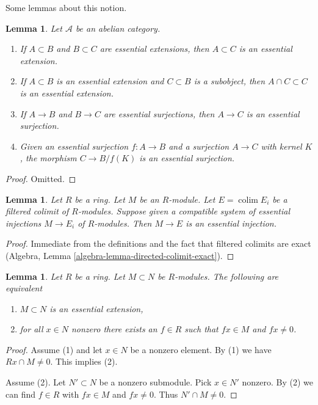 \documentclass{stacks-project}
\theoremstyle{plain}
\newtheorem{lemma}[subsection]{Lemma}
\theoremstyle{definition}
\theoremstyle{remark}
\numberwithin{equation}{subsection}
\def\colim{\mathop{\mathrm{colim}}\nolimits}
\begin{document}
\noindent
Some lemmas about this notion.

\begin{lemma}
\label{lemma-essential}
Let $\mathcal{A}$ be an abelian category.
\begin{enumerate}
\item If $A \subset B$ and $B \subset C$ are essential extensions, then
$A \subset C$ is an essential extension.
\item If $A \subset B$ is an essential extension and $C \subset B$
is a subobject, then $A \cap C \subset C$ is an essential extension.
\item If $A \to B$ and $B \to C$ are essential surjections, then
$A \to C$ is an essential surjection.
\item Given an essential surjection $f : A \to B$ and a surjection
$A \to C$ with kernel $K$, the morphism $C \to B/f(K)$ is an essential
surjection.
\end{enumerate}
\end{lemma}

\begin{proof}
Omitted.
\end{proof}

\begin{lemma}
\label{lemma-union-essential-extensions}
Let $R$ be a ring. Let $M$ be an $R$-module. Let $E = \colim E_i$
be a filtered colimit of $R$-modules. Suppose given a compatible
system of essential injections $M \to E_i$ of $R$-modules.
Then $M \to E$ is an essential injection.
\end{lemma}

\begin{proof}
Immediate from the definitions and the fact that filtered
colimits are exact (Algebra, Lemma \ref{algebra-lemma-directed-colimit-exact}).
\end{proof}

\begin{lemma}
\label{lemma-essential-extension}
Let $R$ be a ring. Let $M \subset N$ be $R$-modules. The following
are equivalent
\begin{enumerate}
\item $M \subset N$ is an essential extension,
\item for all $x \in N$ nonzero there exists an $f \in R$ such that $fx \in M$
and $fx \not = 0$.
\end{enumerate}
\end{lemma}

\begin{proof}
Assume (1) and let $x \in N$ be a nonzero element. By (1) we have
$Rx \cap M \not = 0$. This implies (2).

\medskip\noindent
Assume (2). Let $N' \subset N$ be a nonzero submodule. Pick $x \in N'$
nonzero. By (2) we can find $f \in R$ with $fx \in M$ and $fx \not = 0$.
Thus $N' \cap M \not = 0$.
\end{proof}
\end{document}
